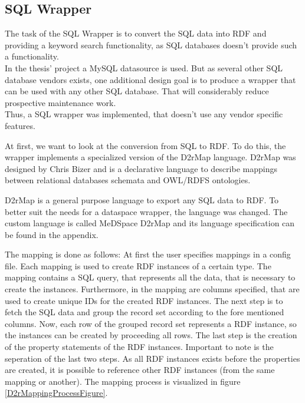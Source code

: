 \subsection{SQL Wrapper}

The task of the SQL Wrapper is to convert the SQL data into RDF and providing a keyword search functionality, as SQL databases doesn't provide such a functionality. \\
In the thesis' project a MySQL datasource is used. But as several other SQL database vendors exists, one additional design goal is to produce a wrapper that can be used with any other SQL database. That will considerably reduce prospective maintenance work.\\
Thus, a SQL wrapper was implemented, that doesn't use any vendor specific features.

At first, we want to look at the conversion from SQL to RDF. To do this, the wrapper implements a specialized version of the D2rMap language. D2rMap was designed by Chris Bizer and is  a declarative language to describe mappings between relational databases schemata and OWL/RDFS ontologies\cite{D2rMap_aDatabaseToRdfMappingLanguage}.

D2rMap is a general purpose language to export any SQL data to RDF. To better suit the needs for a dataspace wrapper, the language was changed. The custom language is called MeDSpace D2rMap and its language specification can be found in the appendix.

The mapping is done as follows: At first the user specifies mappings in a config file. Each mapping is used to create RDF instances of a certain type. The mapping contains a SQL query, that represents all the data, that is necessary to create the instances. Furthermore, in the mapping are columns specified, that are used to create unique IDs for the created RDF instances.
The next step is to fetch the SQL data and group the record set according to the fore mentioned columns. Now, each row of the grouped record set represents a RDF instance, so the instances can be created by proceeding all rows. The last step is the creation of the property statements of the RDF instances. Important to note is the seperation of the last two steps. As all RDF instances exists before the properties are created, it is possible to reference other RDF instances (from the same mapping or another). The mapping process is visualized in figure \ref{D2rMappingProcessFigure}.

